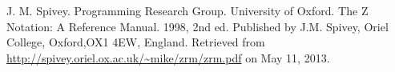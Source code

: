 
\begin{thebibliography}{9} %


J. M. Spivey. Programming Research Group. University of Oxford. The Z Notation:
A Reference Manual. 1998, 2nd ed. Published by J.M. Spivey, Oriel College,
Oxford,OX1 4EW, England.  Retrieved from
\url{http://spivey.oriel.ox.ac.uk/~mike/zrm/zrm.pdf} on May 11, 2013.

\end{thebibliography}

